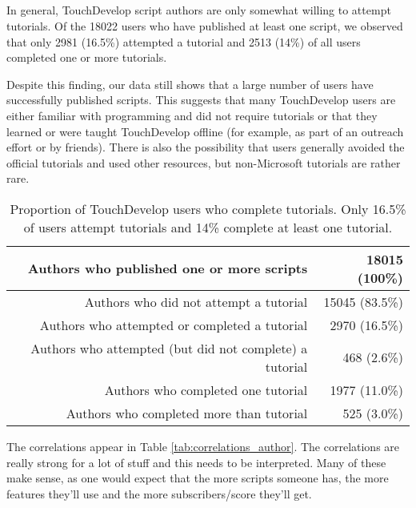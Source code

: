 
\subsection{\rqtutorial}

In general, TouchDevelop script authors are only somewhat willing to attempt tutorials. Of the 18022 users who have published at least one script, we observed that only 2981 (16.5\%) attempted a tutorial and 2513 (14\%) of all users completed one or more tutorials.

 Despite this finding, our data still shows that a large number of users have successfully published scripts. This suggests that many TouchDevelop users are either familiar with programming and did not require tutorials or that they learned or were taught TouchDevelop offline (for example, as part of an outreach effort or by friends). There is also the possibility that users generally avoided the official tutorials and used other resources, but non-Microsoft tutorials are rather rare. 

\begin{table}
	\centering
	\begin{tabular}{rr}
		\toprule
		Authors who published one or more scripts & 18015 (100\%) \\
		\midrule
		Authors who did not attempt a tutorial & 15045 (83.5\%) \\
		Authors who attempted or completed a tutorial & 2970 (16.5\%)\\
		\midrule
		Authors who attempted (but did not complete) a tutorial & 468 (2.6\%) \\
		Authors who completed one tutorial & 1977 (11.0\%) \\
		Authors who completed more than tutorial & 525 (3.0\%) \\
		\bottomrule
	\end{tabular}
	\caption{Proportion of TouchDevelop users who complete tutorials. Only 16.5\% of users attempt tutorials and 14\% complete at least one tutorial.}
	\label{tab:tutorial_completions}
\end{table}




 The correlations appear in Table \ref{tab:correlations_author}. The correlations are really strong for a lot of stuff and this needs to be interpreted. Many of these make sense, as one would expect that the more scripts someone has, the more features they'll use and the more subscribers/score they'll get.

